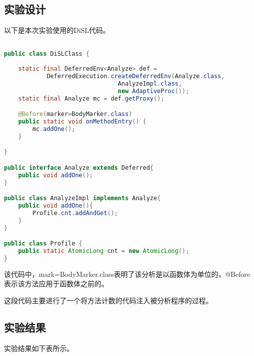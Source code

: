 \subsection{实验设计}

以下是本次实验使用的DiSL代码。

\begin{lstlisting}[language=Java]

public class DiSLClass {
	
	static final DeferredEnv<Analyze> def = 
			DeferredExecution.createDeferredEnv(Analyze.class, 
								AnalyzeImpl.class, 
								new AdaptiveProc());
	static final Analyze mc = def.getProxy();

	@Before(marker=BodyMarker.class)
	public static void onMethodEntry() {
		mc.addOne();
	}

}

public interface Analyze extends Deferred{
	public void addOne();
}

public class AnalyzeImpl implements Analyze{
	public void addOne(){
		Profile.cnt.addAndGet();
	}
}

public class Profile {
	public static AtomicLong cnt = new AtomicLong();
}
\end{lstlisting}

该代码中，mark=BodyMarker.class表明了该分析是以函数体为单位的，@Before表示该方法应用于函数体之前的。

这段代码主要进行了一个将方法计数的代码注入被分析程序的过程。

\subsection{实验结果}

实验结果如下表所示。
